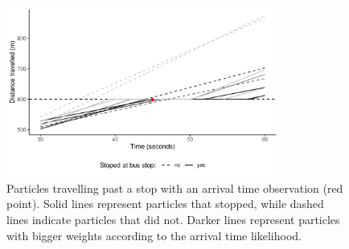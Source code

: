 \begin{knitrout}\small
{}\color{fgcolor}\begin{figure}

{\centering \includegraphics[width=0.8\textwidth]{figure/tu_update-1} 

}

\caption[Particles are weighted by their arrival time at a stop]{Particles travelling past a stop with an arrival time observation (red point). Solid lines represent particles that stopped, while dashed lines indicate particles that did not. Darker lines represent particles with bigger weights according to the arrival time likelihood.}\label{fig:tu_update}
\end{figure}


\end{knitrout}
